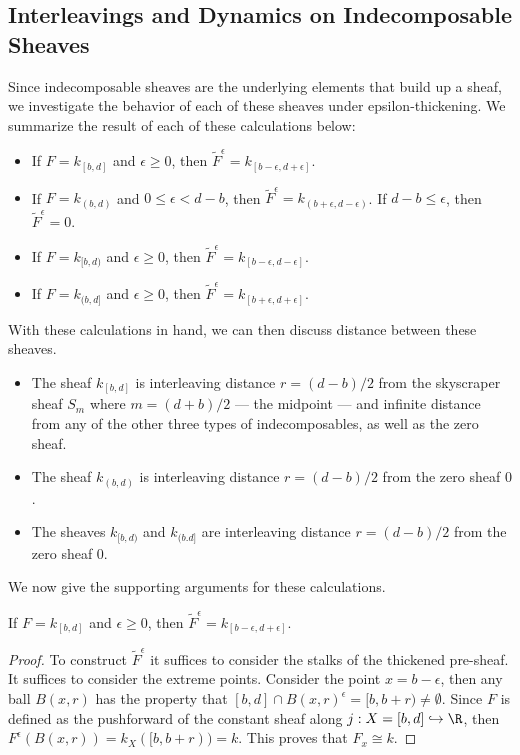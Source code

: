 \subsection{Interleavings and Dynamics on Indecomposable Sheaves}
Since indecomposable sheaves are the underlying elements that build up a sheaf, we investigate the behavior of each of these sheaves under epsilon-thickening. We summarize the result of each of these calculations below:
\begin{itemize}
\item If $F=k_{[b,d]}$ and $\epsilon \geq 0$, then $\widetilde{F}^{\epsilon}=k_{[b-\epsilon,d+\epsilon]}$.
\item If $F=k_{(b,d)}$ and $0\leq \epsilon < d-b$, then $\widetilde{F}^{\epsilon}=k_{(b+\epsilon,d-\epsilon)}$. If $d-b\leq \epsilon$, then $\widetilde{F}^{\epsilon}=0$.
\item If $F=k_{[b,d)}$ and $\epsilon \geq 0$, then $\widetilde{F}^{\epsilon}=k_{[b-\epsilon,d-\epsilon]}$.
\item If $F=k_{(b,d]}$ and $\epsilon \geq 0$, then $\widetilde{F}^{\epsilon}=k_{[b+\epsilon,d+\epsilon]}$.
\end{itemize}
With these calculations in hand, we can then discuss distance between these sheaves.
\begin{itemize}
\item The sheaf $k_{[b,d]}$ is interleaving distance $r=(d-b)/2$ from the skyscraper sheaf $S_{m}$ where $m=(d+b)/2$ --- the midpoint --- and infinite distance from any of the other three types of indecomposables, as well as the zero sheaf.
\item The sheaf $k_{(b,d)}$ is interleaving distance $r=(d-b)/2$ from the zero sheaf $0$.
\item The sheaves $k_{[b,d)}$ and $k_{(b.d]}$ are interleaving distance $r=(d-b)/2$ from the zero sheaf $0$.
\end{itemize}

We now give the supporting arguments for these calculations.

\begin{prop}
If $F=k_{[b,d]}$ and $\epsilon\geq 0$, then $\widetilde{F}^{\epsilon}=k_{[b-\epsilon,d+\epsilon]}$.
\end{prop}
\begin{proof}
To construct $\widetilde{F}^{\epsilon}$ it suffices to consider the stalks of the thickened pre-sheaf. It suffices to consider the extreme points. Consider the point $x=b-\epsilon$, then any ball $B(x,r)$ has the property that $[b,d]\cap B(x,r)^{\epsilon}=[b,b+r)\neq\emptyset$. Since $F$ is defined as the pushforward of the constant sheaf along $j:X=[b,d]\hookrightarrow \R$, then $F^{\epsilon}(B(x,r))=k_X([b,b+r))=k$. This proves that $F_x\cong k$.
\end{proof}

